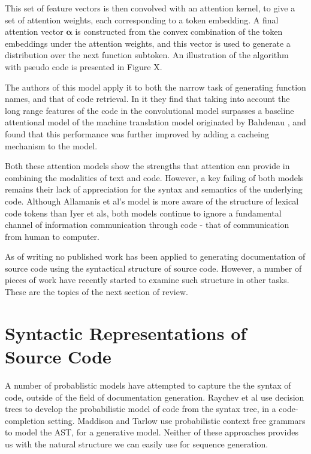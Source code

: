 This set of feature vectors is then convolved with an attention kernel, to give a set of attention weights, each corresponding to a token embedding. 
A final attention vector $\mathbf{\alpha}$ is constructed from the convex combination of the token embeddings under the attention weights, and this vector is used to generate a distribution over the next function subtoken.
An illustration of the algorithm with pseudo code is presented in Figure X.

The authors of this model apply it to both the narrow task of generating function names, and that of code retrieval. In it they find that taking into account the long range features of the code in the convolutional model surpasses a baseline attentional model of the machine translation model originated by Bahdenau \cite{bahdanau_neural_2014}, and found that this performance was further improved by adding a cacheing mechanism to the model.

Both these attention models show the strengths that attention can provide in combining the modalities of text and code. However, a key failing of both models remains their lack of appreciation for the syntax and semantics of the underlying code.
Although Allamanis et al's model is more aware of the structure of lexical code tokens than Iyer et als, both models continue to ignore a fundamental channel of information communication through code - that of communication from human to computer.


As of writing no published work has been applied to generating documentation of source code using the syntactical structure of source code.  However, a number of pieces of work have recently started to examine such structure in other tasks. These are the topics of the next section of review.

\section{Syntactic Representations of Source Code}

A number of probablistic models have attempted to capture the the syntax of code, outside of the field of documentation generation.
Raychev et al \cite{raychev_probabilistic_nodate} use decision trees to develop the probabilistic model of code from the syntax tree, in a code-completion setting. 
Maddison and Tarlow \cite{maddison_structured_2014} use probabilistic context free grammars to model the AST, for a generative model. 
Neither of these approaches provides us with the natural structure we can easily use for sequence generation. 

